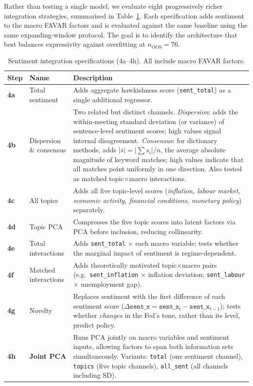 Rather than testing a single model, we evaluate eight progressively richer integration strategies, summarised in Table~\ref{tab:specs}. Each specification adds sentiment to the macro FAVAR factors and is evaluated against the same baseline using the same expanding-window protocol. The goal is to identify the architecture that best balances expressivity against overfitting at $n_{\text{OOS}} = 76$.

\begin{table}[ht]
\centering
\caption{Sentiment integration specifications (4a--4h). All include macro FAVAR factors.}
\label{tab:specs}
\small
\begin{tabular}{>{\bfseries}lp{4.2cm}p{6.8cm}}
\toprule
Step & Name & Description \\
\midrule
4a & Total sentiment       & Adds aggregate hawkishness score (\texttt{sent\_total}) as a single additional regressor. \\
4b & Dispersion \& consensus & Two related but distinct channels. \textit{Dispersion}: adds the within-meeting standard deviation (or variance) of sentence-level sentiment scores; high values signal internal disagreement. \textit{Consensus}: for dictionary methods, adds $|\bar{s}| = |\sum s_i|/n$, the average absolute magnitude of keyword matches; high values indicate that all matches point uniformly in one direction. Also tested as matched topic$\times$macro interactions. \\
4c & All topics            & Adds all five topic-level scores (\textit{inflation, labour market, economic activity, financial conditions, monetary policy}) separately. \\
4d & Topic PCA             & Compresses the five topic scores into latent factors via PCA before inclusion, reducing collinearity. \\
4e & Total interactions    & Adds \texttt{sent\_total} $\times$ each macro variable; tests whether the marginal impact of sentiment is regime-dependent. \\
4f & Matched interactions  & Adds theoretically motivated topic$\times$macro pairs (e.g.\ \texttt{sent\_inflation} $\times$ inflation deviation; \texttt{sent\_labour} $\times$ unemployment gap). \\
4g & Novelty               & Replaces sentiment with the first difference of each sentiment score ($\Delta\texttt{sent\_x} = \texttt{sent\_x}_t - \texttt{sent\_x}_{t-1}$); tests whether \textit{changes} in the Fed's tone, rather than its level, predict policy. \\
4h & \textbf{Joint PCA}    & Runs PCA jointly on macro variables and sentiment inputs, allowing factors to span both information sets simultaneously. Variants: \texttt{total} (one sentiment channel), \texttt{topics} (five topic channels), \texttt{all\_sent} (all channels including SD). \\
\bottomrule
\end{tabular}
\end{table}

